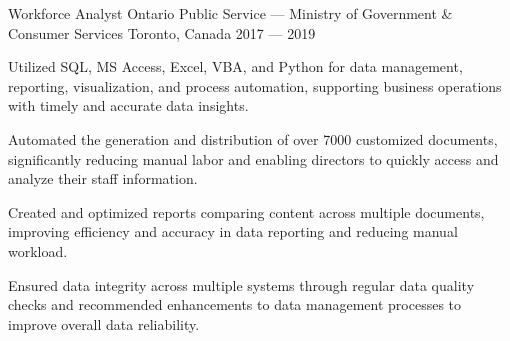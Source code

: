 \begin{cventries}
\cventry%
  {Workforce Analyst}
  {Ontario Public Service --- Ministry of Government \& Consumer Services}
  {Toronto, Canada}
  {2017 --- 2019}
  {
    \begin{cvitems}
      \item Utilized SQL, MS Access, Excel, VBA, and Python for data management, reporting, visualization, and process automation, supporting business operations with timely and accurate data insights.
      \item Automated the generation and distribution of over 7000 customized documents, significantly reducing manual labor and enabling directors to quickly access and analyze their staff information.
      \item Created and optimized reports comparing content across multiple documents, improving efficiency and accuracy in data reporting and reducing manual workload.
      \item Ensured data integrity across multiple systems through regular data quality checks and recommended enhancements to data management processes to improve overall data reliability.
    \end{cvitems}
  }

\end{cventries}
